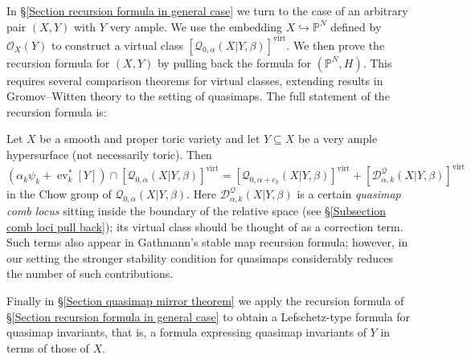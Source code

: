 \documentclass[11pt]{amsart}
\newcommand{\Q}[4]{\mathcal{Q}_{#1,#2}(#3,#4)}
\newcommand{\PP}{\mathbb P}
\newcommand{\OO}{\mathcal{O}}
\newcommand{\virt}[1]{[#1]^{\operatorname{virt}}}
\newcommand{\ev}{\operatorname{ev}}
\theoremstyle{definition}
\newenvironment{customthm}[1]
  {\renewcommand\theinnercustomthm{#1}\innercustomthm}
  {\endinnercustomthm}
\theoremstyle{definition}
\begin{document}
In \S \ref{Section recursion formula in general case} we turn to the case of an arbitrary pair $(X,Y)$ with $Y$ very ample. We use the embedding $X \hookrightarrow \PP^N$ defined by $\OO_X(Y)$ to construct a virtual class $\virt{\Q{0}{\alpha}{X|Y}{\beta}}$.
We then prove the recursion formula for $(X,Y)$ by pulling back the formula for $(\PP^N,H)$. This requires several comparison theorems for virtual classes, extending results in Gromov--Witten theory to the setting of quasimaps. The full statement of the recursion formula is:

\begin{customthm}{\ref{Theorem general recursion}} Let $X$ be a smooth and proper toric variety and let $Y \subseteq X$ be a very ample hypersurface (not necessarily toric). Then
\begin{equation*} (\alpha_k \psi_k + \ev_k^* [Y]) \cap \virt{\Q{0}{\alpha}{X|Y}{\beta}} = \virt{\Q{0}{\alpha+e_k}{X|Y}{\beta}} + \virt{\mathcal D^\mathcal{Q}_{\alpha,k}(X|Y,\beta)} \end{equation*}
in the Chow group of $\Q{0}{\alpha}{X|Y}{\beta}$. 
\end{customthm}
\noindent Here $\mathcal D^\mathcal{Q}_{\alpha,k}(X|Y,\beta)$ is a certain \emph{quasimap comb locus} sitting inside the boundary of the relative space (see \S \ref{Subsection comb loci pull back}); its virtual class should be thought of as a correction term. Such terms also appear in Gathmann's stable map recursion formula; however, in our setting the stronger stability condition for quasimaps considerably reduces the number of such contributions.

Finally in \S \ref{Section quasimap mirror theorem} we apply the recursion formula of \S \ref{Section recursion formula in general case} to obtain a Lefschetz-type formula for quasimap invariants, that is, a formula expressing quasimap invariants of $Y$ in terms of those of $X$. 
\end{document}
